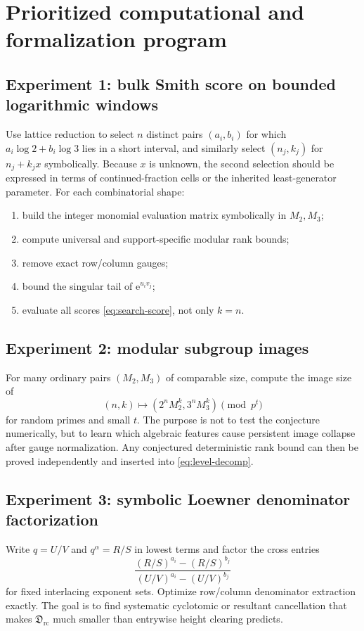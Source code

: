 \documentclass[11pt,oneside]{article}
\theoremstyle{definition}
\theoremstyle{remark}
\newcommand{\Mtwo}{M_2}
\newcommand{\Mthree}{M_3}
\newcommand{\e}{\mathrm{e}}
\begin{document}
\section{Prioritized computational and formalization program}
\label{sec:program}

\subsection{Experiment 1: bulk Smith score on bounded logarithmic windows}

Use lattice reduction to select $n$ distinct pairs $(a_i,b_i)$ for which
$a_i\log2+b_i\log3$ lies in a short interval, and similarly select $(n_j,k_j)$ for
$n_j+k_jx$ symbolically.  Because $x$ is unknown, the second selection should be expressed in terms of continued-fraction cells or the inherited least-generator parameter.  For each combinatorial shape:
\begin{enumerate}
\item build the integer monomial evaluation matrix symbolically in $\Mtwo,\Mthree$;
\item compute universal and support-specific modular rank bounds;
\item remove exact row/column gauges;
\item bound the singular tail of $\e^{u_iv_j}$;
\item evaluate all scores \eqref{eq:search-score}, not only $k=n$.
\end{enumerate}

\subsection{Experiment 2: modular subgroup images}

For many ordinary pairs $(\Mtwo,\Mthree)$ of comparable size, compute the image size of
\[
 (n,k)\mapsto(2^n\Mtwo^k,3^n\Mthree^k)\pmod{p^t}
\]
for random primes and small $t$.  The purpose is not to test the conjecture numerically, but to learn which algebraic features cause persistent image collapse after gauge normalization.  Any conjectured deterministic rank bound can then be proved independently and inserted into \eqref{eq:level-decomp}.

\subsection{Experiment 3: symbolic Loewner denominator factorization}

Write $q=U/V$ and $q^\alpha=R/S$ in lowest terms and factor the cross entries
\[
 \frac{(R/S)^{a_i}-(R/S)^{b_j}}
      {(U/V)^{a_i}-(U/V)^{b_j}}
\]
for fixed interlacing exponent sets.  Optimize row/column denominator extraction exactly.  The goal is to find systematic cyclotomic or resultant cancellation that makes
$\mathfrak D_{\mathrm{rc}}$ much smaller than entrywise height clearing predicts.
\end{document}
